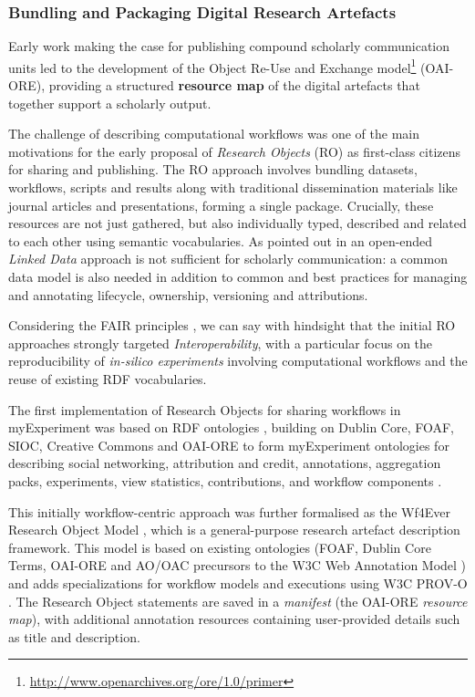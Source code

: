 \subsubsection{Bundling and Packaging Digital Research
Artefacts}\label{ch5:bundling-and-packaging-digital-research-artefacts}

Early work making the case for publishing compound scholarly
communication units
\cite{ch5-117}
led to the development of the
Object Re-Use and Exchange
model\footnote{\url{http://www.openarchives.org/ore/1.0/primer}} (OAI-ORE), providing a structured \textbf{resource map}
of the digital artefacts that together support a scholarly output.

The challenge of describing computational workflows was one of the main
motivations for the early proposal of \emph{Research Objects} (RO)
\cite{Bechhofer 2013}
as first-class citizens for sharing and publishing. The RO approach
involves bundling datasets, workflows, scripts and results along with
traditional dissemination materials like journal articles and
presentations, forming a single package. Crucially, these resources are
not just gathered, but also individually typed, described and related to
each other using semantic vocabularies. As pointed out in
\cite{Bechhofer 2013} an
open-ended \emph{Linked Data} approach is not sufficient for scholarly
communication: a common data model is also needed in addition to common
and best practices for managing and annotating lifecycle, ownership,
versioning and attributions.

Considering the FAIR principles
\cite{Wilkinson 2016}, we can say with
hindsight that the initial RO approaches strongly targeted
\emph{Interoperability}, with a particular focus on the reproducibility
of \emph{in-silico experiments} involving computational workflows and
the reuse of existing RDF vocabularies.

The first implementation of Research Objects for sharing workflows in
myExperiment \cite{ch5-57} was
based on RDF ontologies
\cite{ch5-93}, building on
Dublin Core, FOAF, SIOC, Creative Commons and OAI-ORE to form
myExperiment ontologies for describing social networking, attribution
and credit, annotations, aggregation packs, experiments, view
statistics, contributions, and workflow components
\cite{ch5-92}.

This initially workflow-centric approach was further formalised as the
Wf4Ever Research Object Model
\cite{Belhajjame 2015}, which is
a general-purpose research artefact description framework. This model is
based on existing ontologies (FOAF, Dublin Core Terms, OAI-ORE and
AO/OAC precursors to the W3C Web Annotation Model
\cite{Ciccarese 2017})
and adds specializations for workflow models and executions using W3C
PROV-O \cite{w3-prov-o}.
The Research Object statements are saved in a \emph{manifest} (the
OAI-ORE \emph{resource map}), with additional annotation resources
containing user-provided details such as title and description.

